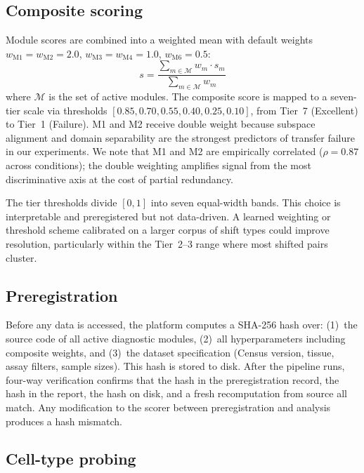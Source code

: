 \documentclass[11pt,letterpaper]{article}
\begin{document}
\subsection{Composite scoring}

Module scores are combined into a weighted mean with default weights $w_{\mathrm{M1}} = w_{\mathrm{M2}} = 2.0$, $w_{\mathrm{M3}} = w_{\mathrm{M4}} = 1.0$, $w_{\mathrm{M6}} = 0.5$:
\begin{equation}
\label{eq:composite}
s = \frac{\sum_{m \in \mathcal{M}} w_m \cdot s_m}{\sum_{m \in \mathcal{M}} w_m}
\end{equation}
where $\mathcal{M}$ is the set of active modules. The composite score is mapped to a seven-tier scale via thresholds $[0.85, 0.70, 0.55, 0.40, 0.25, 0.10]$, from Tier~7 (Excellent) to Tier~1 (Failure). M1 and M2 receive double weight because subspace alignment and domain separability are the strongest predictors of transfer failure in our experiments. We note that M1 and M2 are empirically correlated ($\rho = 0.87$ across conditions); the double weighting amplifies signal from the most discriminative axis at the cost of partial redundancy.

The tier thresholds divide $[0, 1]$ into seven equal-width bands. This choice is interpretable and preregistered but not data-driven. A learned weighting or threshold scheme calibrated on a larger corpus of shift types could improve resolution, particularly within the Tier~2--3 range where most shifted pairs cluster.

\subsection{Preregistration}

Before any data is accessed, the platform computes a SHA-256 hash over: (1)~the source code of all active diagnostic modules, (2)~all hyperparameters including composite weights, and (3)~the dataset specification (Census version, tissue, assay filters, sample sizes). This hash is stored to disk. After the pipeline runs, four-way verification confirms that the hash in the preregistration record, the hash in the report, the hash on disk, and a fresh recomputation from source all match. Any modification to the scorer between preregistration and analysis produces a hash mismatch.

\subsection{Cell-type probing}
\end{document}
